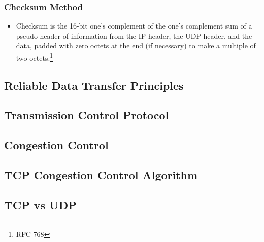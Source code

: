 \subsubsection{Checksum Method}
\begin{itemize}
	\item Checksum is the 16-bit one's complement of the one's complement sum of a pseudo header of information from the IP header, the UDP header, and the data, padded with zero octets at the end (if necessary) to make a multiple of two octets.\footnote{RFC 768}
\end{itemize}

\subsection{Reliable Data Transfer Principles}

\subsection{Transmission Control Protocol}

\subsection{Congestion Control}

\subsection{TCP Congestion Control Algorithm}

\subsection{TCP vs UDP}